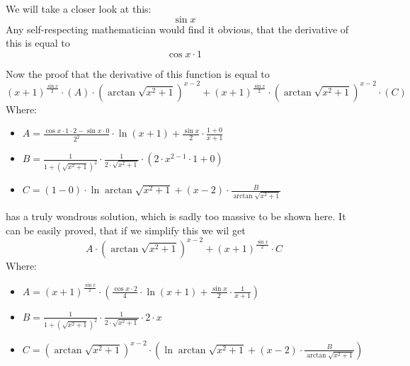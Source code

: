 \documentclass{article}
\begin{document}
We will take a closer look at this:
\begin{equation}
\sin x 
\end{equation}
Any self-respecting mathematician would find it obvious, that the derivative of this is equal to
\begin{equation}
\cos x \cdot 1 
\end{equation}

Now the proof that the derivative of this function is equal to
\begin{equation}
\left( x + 1 \right) ^{\frac{\sin x }{2 } } \cdot \left( A \right) \cdot \left( \arctan \sqrt {x ^{2 } + 1 } \right) ^{x - 2 } + \left( x + 1 \right) ^{\frac{\sin x }{2 } } \cdot \left( \arctan \sqrt {x ^{2 } + 1 } \right) ^{x - 2 } \cdot \left( C \right) 
\end{equation}
Where:
\begin{itemize}
	\item $A = \frac{\cos x \cdot 1 \cdot 2 - \sin x \cdot 0 }{2 ^{2 } } \cdot \ln \left( x + 1 \right) + \frac{\sin x }{2 } \cdot \frac{1 + 0 }{x + 1 } $
	\item $B = \frac{1 }{1 + \left( \sqrt {x ^{2 } + 1 } \right) ^{2 } } \cdot \frac{1 }{2 \cdot \sqrt {x ^{2 } + 1 } } \cdot \left( 2 \cdot x ^{2 - 1 } \cdot 1 + 0 \right) $
	\item $C = \left( 1 - 0 \right) \cdot \ln \arctan \sqrt {x ^{2 } + 1 } + \left( x - 2 \right) \cdot \frac{B }{\arctan \sqrt {x ^{2 } + 1 } } $
\end{itemize}

has a truly wondrous solution, which is sadly too massive to be shown here.
It can be easily proved, that if we simplify this we wil get
\begin{equation}
A \cdot \left( \arctan \sqrt {x ^{2 } + 1 } \right) ^{x - 2 } + \left( x + 1 \right) ^{\frac{\sin x }{2 } } \cdot C 
\end{equation}
Where:
\begin{itemize}
	\item $A = \left( x + 1 \right) ^{\frac{\sin x }{2 } } \cdot \left( \frac{\cos x \cdot 2 }{4 } \cdot \ln \left( x + 1 \right) + \frac{\sin x }{2 } \cdot \frac{1 }{x + 1 } \right) $
	\item $B = \frac{1 }{1 + \left( \sqrt {x ^{2 } + 1 } \right) ^{2 } } \cdot \frac{1 }{2 \cdot \sqrt {x ^{2 } + 1 } } \cdot 2 \cdot x $
	\item $C = \left( \arctan \sqrt {x ^{2 } + 1 } \right) ^{x - 2 } \cdot \left( \ln \arctan \sqrt {x ^{2 } + 1 } + \left( x - 2 \right) \cdot \frac{B }{\arctan \sqrt {x ^{2 } + 1 } } \right) $
\end{itemize}
\end{document}
